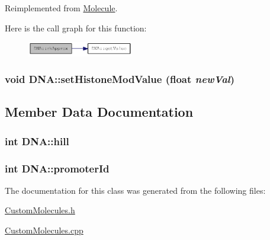Reimplemented from \hyperlink{classMolecule_adabb58a65655a7f55dae0d82b65d04ba}{Molecule}.

Here is the call graph for this function:\nopagebreak
\begin{figure}[H]
\begin{center}
\leavevmode
\includegraphics[width=131pt]{classDNA_a10bec8cdc5922b2780887666c53891f1_cgraph}
\end{center}
\end{figure}
\hypertarget{classDNA_aace4054119b4953683f23b2a0a9fd57c}{
\subsubsection[{setHistoneModValue}]{\setlength{\rightskip}{0pt plus 5cm}void DNA::setHistoneModValue (float {\em newVal})}}
\label{classDNA_aace4054119b4953683f23b2a0a9fd57c}


\subsection{Member Data Documentation}
\hypertarget{classDNA_a1c70e6e5beaf9ac5bfb9ab0d2cbf7f75}{
\subsubsection[{hill}]{\setlength{\rightskip}{0pt plus 5cm}int {\bf DNA::hill}}}
\label{classDNA_a1c70e6e5beaf9ac5bfb9ab0d2cbf7f75}
\hypertarget{classDNA_a29696d77ea7eaabd48ee1d7eb9705b8e}{
\subsubsection[{promoterId}]{\setlength{\rightskip}{0pt plus 5cm}int {\bf DNA::promoterId}}}
\label{classDNA_a29696d77ea7eaabd48ee1d7eb9705b8e}


The documentation for this class was generated from the following files:\begin{DoxyCompactItemize}
\item 
\hyperlink{CustomMolecules_8h}{CustomMolecules.h}\item 
\hyperlink{CustomMolecules_8cpp}{CustomMolecules.cpp}\end{DoxyCompactItemize}
